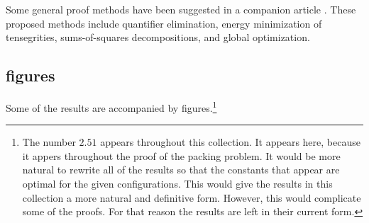 Some general proof methods have been suggested
in a companion article \cite{method}.  These proposed methods include
quantifier elimination, energy minimization of tensegrities,
sums-of-squares decompositions, and global optimization.  


\subsection{figures}

Some of the results are accompanied by figures.\footnote{The number $2.51$ appears
throughout this collection.  It appears here, because it appers throughout
the proof of the packing problem.  It would be more natural to
rewrite all of the results so that the constants that appear are
optimal for the given configurations.  This would give
the results in this collection a more natural and definitive
form.  However, this would complicate some of
the proofs.  For that reason the results are left in their
current form.}
 
